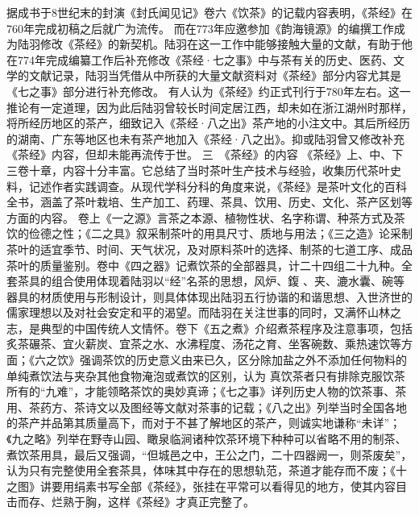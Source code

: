 \documentclass[12pt,UTF8]{ctexbook}
\begin{document}
据成书于8世纪末的封演《封氏闻见记》卷六《饮茶》的记载内容表明，《茶经》在760年完成初稿之后就广为流传。
而在773年应邀参加《韵海镜源》的编撰工作成为陆羽修改《茶经》的新契机。陆羽在这一工作中能够接触大量的文献，有助于他在774年完成编纂工作后补充修改《茶经·七之事》中与茶有关的历史、医药、文学的文献记录，陆羽当凭借从中所获的大量文献资料对《茶经》部分内容尤其是《七之事》部分进行补充修改。
有人认为《茶经》约正式刊行于780年左右。这一推论有一定道理，因为此后陆羽曾较长时间定居江西，却未如在浙江湖州时那样，将所经历地区的茶产，细致记入《茶经·八之出》茶产地的小注文中。其后所经历的湖南、广东等地区也未有茶产地加入《茶经·八之出》。抑或陆羽曾又修改补充《茶经》内容，但却未能再流传于世。
三　《茶经》的内容
《茶经》上、中、下三卷十章，内容十分丰富。它总结了当时茶叶生产技术与经验，收集历代茶叶史料，记述作者实践调查。从现代学科分科的角度来说，《茶经》是茶叶文化的百科全书，涵盖了茶叶栽培、生产加工、药理、茶具、饮用、历史、文化、茶产区划等方面的内容。
卷上《一之源》言茶之本源、植物性状、名字称谓、种茶方式及茶饮的俭德之性；《二之具》叙采制茶叶的用具尺寸、质地与用法；《三之造》论采制茶叶的适宜季节、时间、天气状况，及对原料茶叶的选择、制茶的七道工序、成品茶叶的质量鉴别。卷中《四之器》记煮饮茶的全部器具，计二十四组二十九种。全套茶具的组合使用体现着陆羽以“经”名茶的思想，风炉、鍑
、夹、漉水囊、碗等器具的材质使用与形制设计，则具体体现出陆羽五行协谐的和谐思想、入世济世的儒家理想以及对社会安定和平的渴望。而陆羽在关注世事的同时，又满怀山林之志，是典型的中国传统人文情怀。卷下《五之煮》介绍煮茶程序及注意事项，包括炙茶碾茶、宜火薪炭、宜茶之水、水沸程度、汤花之育、坐客碗数、乘热速饮等方面；《六之饮》强调茶饮的历史意义由来已久，区分除加盐之外不添加任何物料的单纯煮饮法与夹杂其他食物淹泡或煮饮的区别，认为
真饮茶者只有排除克服饮茶所有的“九难”，才能领略茶饮的奥妙真谛；《七之事》详列历史人物的饮茶事、茶用、茶药方、茶诗文以及图经等文献对茶事的记载；《八之出》列举当时全国各地的茶产并品第其质量高下，而对于不甚了解地区的茶产，则诚实地谦称“未详”；《九之略》列举在野寺山园、瞰泉临涧诸种饮茶环境下种种可以省略不用的制茶、煮饮茶用具，最后又强调，“但城邑之中，王公之门，二十四器阙一，则茶废矣”，认为只有完整使用全套茶具，体味其中存在的思想轨范，茶道才能存而不废；《十之图》讲要用绢素书写全部《茶经》，张挂在平常可以看得见的地方，使其内容目击而存、烂熟于胸，这样《茶经》才真正完整了。
\end{document}
